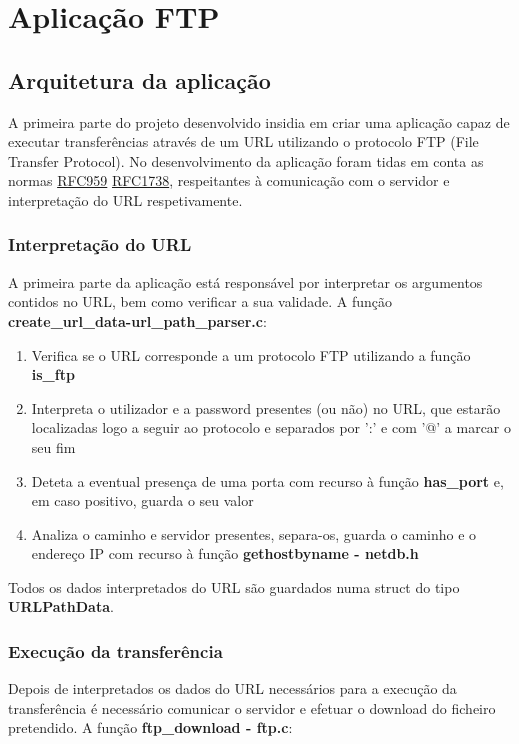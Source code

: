 \section{Aplicação FTP}

\subsection{Arquitetura da aplicação}

A primeira parte do projeto desenvolvido insidia em criar uma aplicação capaz de executar transferências através de um URL utilizando o protocolo FTP (File Transfer Protocol). No desenvolvimento da aplicação foram tidas em conta as normas \href{https://www.rfc-editor.org/info/rfc959}{RFC959} \href{https://www.rfc-editor.org/info/rfc1738}{RFC1738}, respeitantes à comunicação com o servidor e interpretação do URL respetivamente.

\subsubsection{Interpretação do URL}
A primeira parte da aplicação está responsável por interpretar os argumentos contidos no URL, bem como verificar a sua validade. A função \textbf{create\_url\_data-url\_path\_parser.c}:

\begin{enumerate}
    \item Verifica se o URL corresponde a um protocolo FTP utilizando a função \textbf{is\_ftp}
    \item Interpreta o utilizador e a password presentes (ou não) no URL, que estarão localizadas logo a seguir ao protocolo e separados por ':' e com '@' a marcar o seu fim
    \item Deteta a eventual presença de uma porta com recurso à função \textbf{has\_port} e, em caso positivo, guarda o seu valor
    \item Analiza o caminho e servidor presentes, separa-os, guarda o caminho e o endereço IP com recurso à função \textbf{gethostbyname - netdb.h}
\end{enumerate}

Todos os dados interpretados do URL são guardados numa struct do tipo \textbf{URLPathData}.

\subsubsection{Execução da transferência}
Depois de interpretados os dados do URL necessários para a execução da transferência é necessário comunicar o servidor e efetuar o download do ficheiro pretendido. A função \textbf{ftp\_download - ftp.c}:


